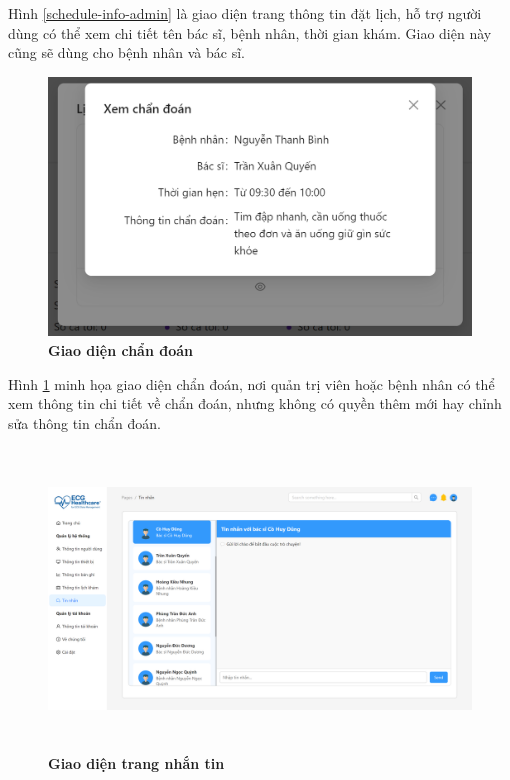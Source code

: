 Hình \ref{schedule-info-admin} là giao diện trang thông tin đặt lịch, hỗ trợ người dùng có thể xem chi tiết tên bác sĩ, bệnh nhân, thời gian khám. Giao diện này cũng sẽ dùng cho bệnh nhân và bác sĩ.

\begin{figure}[H]
	\centering
	\includegraphics[width=12cm]{Images/admin_ui/diagnosis.png}
	\caption[Giao diện chẩn đoán]{\bfseries \fontsize{12pt}{0pt}\selectfont Giao diện chẩn đoán}
	\label{diag-admin}
\end{figure}

Hình \ref{diag-admin} minh họa giao diện chẩn đoán, nơi quản trị viên hoặc bệnh nhân có thể xem thông tin chi tiết về chẩn đoán, nhưng không có quyền thêm mới hay chỉnh sửa thông tin chẩn đoán.

\begin{figure}[H]
	\centering
	\includegraphics[width=15cm,height=8cm]{Images/admin_ui/chat.png}
	\caption[Giao diện trang nhắn tin]{\bfseries \fontsize{12pt}{0pt}\selectfont Giao diện trang nhắn tin}
	\label{chat-admin}
\end{figure}


